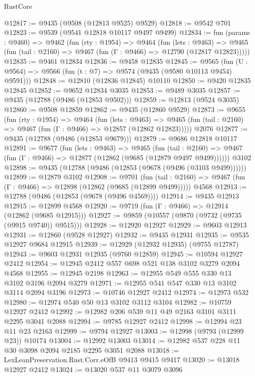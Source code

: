 \begin{lexlean}{RustCore}
\begin{coremodule}
@12817 := @9435 (@9508 (@12813 @9525) @9529)
@12818 := @9542 @701
@12823 := @9539 (@9541 @12818 @10117 @9497 @9499)
@12834 := fun (params : @9460) =>
  @9462
    (fun (rty : @1954) =>
    @9464
      (fun (lets : @9463) =>
      @9465 (fun (tail : @2160) => @9467 (fun (Γ : @9466) => @12790 (@12817 @12823)))))
@12835 := @9461 @12834
@12836 := @9458 @12835
@12845 := @9565
    (fun (U : @9564) => @9566 (fun (t : @7) => @9574 (@9435 (@9580 @10113 @9454) @9591)))
@12848 := @12810 (@12836 @12845) @10110
@12850 := @9420 @12835 @12845
@12852 := @9652 @12834 @3035
@12853 := @9489 @3035
@12857 := @9435 (@12788 (@9486 (@12853 @9502)))
@12859 := @12813 (@9524 @3035)
@12860 := @9508 @12859
@12862 := @9435 (@12860 @9529)
@12873 := @9655
    (fun (rty : @1954) =>
    @9464
      (fun (lets : @9463) =>
      @9465 (fun (tail : @2160) => @9467 (fun (Γ : @9466) => @12857 (@12862 @12823)))))
    @2076
@12877 := @9435 (@12788 (@9486 (@12853 @9679)))
@12879 := @9686 @12818 @10117
@12891 := @9677
    (fun (lets : @9463) =>
    @9465
      (fun (tail : @2160) =>
      @9467 (fun (Γ : @9466) => @12877 (@12862 (@9685 (@12879 @9497 @9499))))))
    @3102
@12898 := @9435 (@12788 (@9486 (@12853 (@9678 (@9496 (@3103 @9499))))))
@12899 := @12879 @3102
@12908 := @9701
    (fun (tail : @2160) => @9467 (fun (Γ : @9466) => @12898 (@12862 (@9685 (@12899 @9499)))))
    @4568
@12913 := @12788 (@9486 (@12853 (@9678 (@9496 @4569))))
@12914 := @9435 @12913
@12915 := @12899 @4568
@12920 := @9719 (fun (Γ : @9466) => @12914 (@12862 (@9685 @12915)))
@12927 := @9859 (@10557 (@9870 (@9732 (@9735 (@9915 @9740)) @9515)))
@12928 := @12920 @12927
@12929 := @9603 @12913
@12931 := @12860 (@9528 @12927)
@12932 := @9435 @12931
@12935 := @9535 @12927 @9684 @12915
@12939 := @12929 (@12932 @12935) (@9755 @12787)
@12943 := @9603 @12931 @12935 (@9760 @12859)
@12945 := @10594 @12927 @2412
@12954 := @12945 @2412 @557 @698 @521 @138 @3102 @3279 @2094 @4568
@12955 := @12945 @2198
@12963 := @12955 @549 @555 @330 @13 @3102 @3196 @2094 @3279
@12971 := @12955 @541 @547 @330 @13 @3102 @3114 @2094 @3196
@12973 := @10746 @12927 @2412
@12974 := @12973 @532
@12980 := @12974 @540 @50 @13 @3102 @3112 @3104
@12982 := @10759 @12927 @2412
@12992 := @12982 @206 @539 @11 @49 @2163 @3101 @3111 @2295 @3041 @2088
@12994 := @9785 @12927 @2412
@12998 := @12994 @23 @11 @23 @2163
@12999 := @9794 @12927
@13003 := @12998 (@9793 (@12999 @23)) @10174
@13004 := @12992 @13003
@13014 := @12982 @537 @228 @11 @30 @3098 @2094 @2185 @2295 @3051 @2088
@13018 := LexLeanPreservation.Rust.Corr.eOfB @9413 @9415 @9417
@13020 := @13018 @12927 @2412
@13024 := @13020 @537 @11 @3079 @3096

\end{coremodule}
\end{lexlean}
